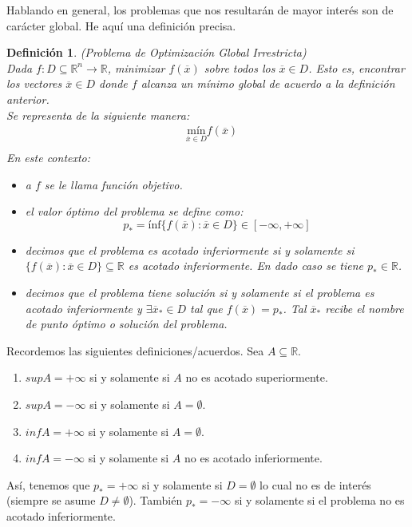\documentclass[11pt]{report}
\newtheorem{definition}{Definición}[section]
\newcommand{\Rn}{\mathbb{R}^{n}}
\newcommand{\R}{\mathbb{R}}
\newcommand{\x}{\overline{x}}
\newcommand{\po}{p_{*}}
\newcommand{\xo}{\overline{x}_{*}}
\begin{document}
Hablando en general, los problemas que nos resultarán de mayor interés son de carácter global. He aquí una definición precisa.
\begin{definition}{(Problema de Optimización Global Irrestricta)}\\
Dada $f:D\subseteq\Rn\rightarrow\R$, minimizar $f(\x)$ sobre todos los $\x\in D$. Esto es, encontrar los vectores $\x \in D$ donde $f$ alcanza un mínimo global de acuerdo a la definición anterior.\\
Se representa de la siguiente manera:
\begin{equation*}
\begin{aligned}
& \underset{\x\in D}{\text{mín}} f(\x) \\
\end{aligned}
\end{equation*}
En este contexto:
\begin{itemize}
\item[(i)] a $f$ se le llama \emph{función objetivo}.
\item[(ii)] el \emph{valor óptimo} del problema  se define como:
$$\po=\text{ínf}\{f(\x):\x\in D\}\in[-\infty, +\infty]$$
\item[(iii)] decimos que \emph{el problema es acotado inferiormente} si y solamente si $\{f(\x):\x\in D\}\subseteq\R$ es acotado inferiormente. En dado caso se tiene $\po\in\R$.
\item[(iv)] decimos que \emph{el problema tiene solución} si y solamente si el problema es acotado inferiormente y $\exists\xo\in D$ tal que $f(\x)=\po$. Tal $\xo$ recibe el nombre de \emph{punto óptimo} o \emph{solución del problema}.
\end{itemize}
\end{definition}
Recordemos las siguientes definiciones/acuerdos. Sea $A\subseteq\R$.
\begin{enumerate}
\item $sup A=+\infty$ si y solamente si $A$ no es acotado superiormente.
\item $sup A=-\infty$ si y solamente si $A=\emptyset$.
\item $inf A=+\infty$ si y solamente si $A=\emptyset$.
\item $inf A=-\infty$ si y solamente si $A$ no es acotado inferiormente.
\end{enumerate}

Así, tenemos que $\po=+\infty$ si y solamente si $D=\emptyset$ lo cual no es de interés (siempre se asume $D\ne\emptyset$). También $\po=-\infty$ si y solamente si el problema no es acotado inferiormente.\\
\end{document}
